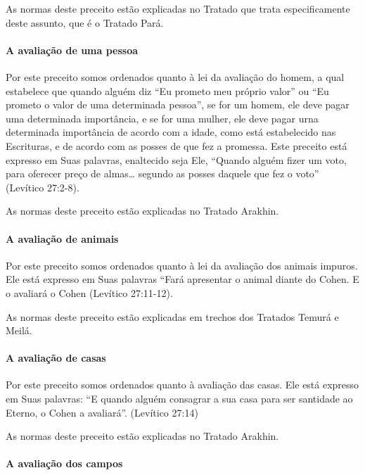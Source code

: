 As normas deste preceito estão explicadas no Tratado que trata
especificamente deste assunto, que é o Tratado Pará.



\paragraph{A avaliação de uma pessoa}

Por este preceito somos ordenados quanto à lei da avaliação do homem, a
qual estabelece que quando alguém diz ``Eu prometo meu próprio valor''
ou ``Eu prometo o valor de uma determinada pessoa'', se for um homem,
ele deve pagar uma determinada importância, e se for uma mulher, ele
deve pagar urna determinada importância de acordo com a idade, como está
estabelecido nas Escrituras, e de acordo com as posses de que fez a
promessa. Este preceito está expresso em Suas palavras, enaltecido seja
Ele, ``Quando alguém fizer um voto, para oferecer preço de almas\ldots{}
segundo as posses daquele que fez o voto'' (Levítico 27:2-8).

As normas deste preceito estão explicadas no Tratado Arakhin.


\paragraph{A avaliação de animais}

Por este preceito somos ordenados quanto à lei da avaliação dos animais
impuros. Ele está expresso em Suas palavras ``Fará apresentar o animal
diante do Cohen. E o avaliará o Cohen (Levítico 27:11-12).

As normas deste preceito estão explicadas em trechos dos Tratados Temurá
e Meilá.

\paragraph{A avaliação de casas}

Por este preceito somos ordenados quanto à avaliação das casas. Ele está
expresso em Suas palavras: ``E quando alguém consagrar a sua casa para
ser santidade ao Eterno, o Cohen a avaliará''. (Levítico 27:14)

As normas deste preceito estão explicadas no Tratado Arakhin.

\paragraph{A avaliação dos campos}

